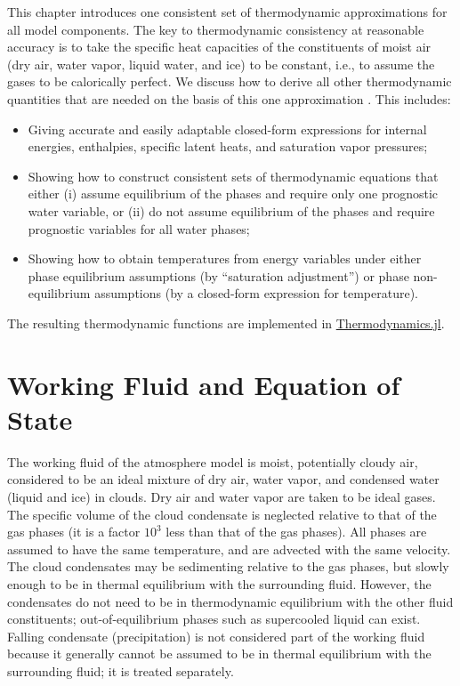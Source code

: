 \documentclass{report}
\begin{document}
This chapter introduces one consistent set of thermodynamic approximations for all model components. The key to thermodynamic consistency at reasonable accuracy is to take the specific heat capacities of the constituents of moist air (dry air, water vapor, liquid water, and ice) to be constant, i.e., to assume the gases to be calorically perfect. We discuss how to derive all other thermodynamic quantities that are needed on the basis of this one approximation \citep[cf.][]{Romps08a,Marquet16a}. This includes: 
\begin{itemize}
    \item Giving accurate and easily adaptable closed-form expressions for internal energies, enthalpies, specific latent heats, and saturation vapor pressures;
    \item Showing how to construct consistent sets of thermodynamic equations that either (i) assume equilibrium of the phases and require only one prognostic water variable, or (ii) do not assume equilibrium of the phases and require prognostic variables for all water phases;
    \item Showing how to obtain temperatures from energy variables under either phase equilibrium assumptions (by ``saturation adjustment'') or phase non-equilibrium assumptions (by a closed-form expression for temperature).
\end{itemize}
The resulting thermodynamic functions are implemented in \href{https://github.com/climate-machine/CLIMA/tree/master/src/Common/Thermodynamics}{Thermodynamics.jl}.

\section{Working Fluid and Equation of State}

The working fluid of the atmosphere model is moist, potentially cloudy air, considered to be an ideal mixture of dry air, water vapor, and condensed water (liquid and ice) in clouds. Dry air and water vapor are taken to be ideal gases. The specific volume of the cloud condensate is neglected relative to that of the gas phases (it is a  factor $10^{3}$ less than that of the gas phases). All phases are assumed to have the same temperature, and are advected with the same velocity. The cloud condensates may be sedimenting relative to the gas phases, but slowly enough to be in thermal equilibrium with the surrounding fluid. However, the condensates do not need to be in thermodynamic equilibrium with the other fluid constituents; out-of-equilibrium phases such as supercooled liquid can exist. Falling condensate (precipitation) is not considered part of the working fluid because it generally cannot be assumed to be in thermal equilibrium with the surrounding fluid; it is treated separately.
\end{document}
